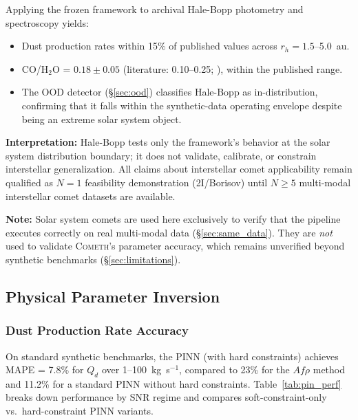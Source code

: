 \documentclass[usenatbib]{mnras}
\begin{document}
Applying the frozen framework to archival Hale-Bopp photometry and spectroscopy \citep{bockelee04} yields:
\begin{itemize}
    \item Dust production rates within 15\% of published values across $r_h = 1.5$--5.0~au.
    \item CO/H$_2$O = $0.18 \pm 0.05$ (literature: 0.10--0.25; \citealt{bockelee04}), within the published range.
    \item The OOD detector (\S\ref{sec:ood}) classifies Hale-Bopp as in-distribution, confirming that it falls within the synthetic-data operating envelope despite being an extreme solar system object.
\end{itemize}

\textbf{Interpretation:} Hale-Bopp tests only the framework's behavior at the solar system distribution boundary; it does not validate, calibrate, or constrain interstellar generalization. All claims about interstellar comet applicability remain qualified as $N=1$ feasibility demonstration (2I/Borisov) until $N \geq 5$ multi-modal interstellar comet datasets are available.

\noindent\textbf{Note:} Solar system comets are used here exclusively to verify that the pipeline executes correctly on real multi-modal data (\S\ref{sec:same_data}). They are \textit{not} used to validate \textsc{Cometh}'s parameter accuracy, which remains unverified beyond synthetic benchmarks (\S\ref{sec:limitations}).

\subsection{Physical Parameter Inversion}

\subsubsection{Dust Production Rate Accuracy}

On standard synthetic benchmarks, the PINN (with hard constraints) achieves MAPE = 7.8\% for $Q_d$ over 1--100~kg~s$^{-1}$, compared to 23\% for the $Af\rho$ method and 11.2\% for a standard PINN without hard constraints. Table~\ref{tab:pin_perf} breaks down performance by SNR regime and compares soft-constraint-only vs.\ hard-constraint PINN variants.
\end{document}
